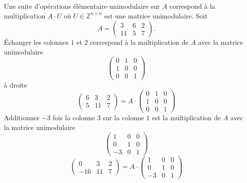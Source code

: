\begin{example}
  \label{exe:27}
  Une suite d'opérations élémentaire unimodulaire sur $A$ correspond à la multiplication $A⋅U$ où $U ∈ℤ^{n ×n}$ est une matrice unimodulaire.
Soit 
  \begin{displaymath}
    A =
    \begin{pmatrix}
      3 & 6 & 2 \\
      11 & 5 & 7
    \end{pmatrix}. 
  \end{displaymath}
  Échanger les colonnes $1$ et $2$ correspond à la multiplication de $A$ avec la matrice unimodulaire 
  \begin{displaymath}
    \begin{pmatrix}
    0& 1 & 0 \\
    1 & 0 & 0 \\
    0 & 0 & 1
      
    \end{pmatrix}
  \end{displaymath} à droite
  \begin{displaymath}
     \begin{pmatrix}
      6  & 3& 2 \\
       5 & 11 & 7
     \end{pmatrix} = A ⋅
     \begin{pmatrix}
       0& 1 & 0 \\
       1 & 0 & 0 \\
       0 & 0 & 1
     \end{pmatrix}
   \end{displaymath}
   Additionner $-3$ fois la colonne $3$ sur la colonne $1$ est la multiplication de $A$ avec la matrice unimodulaire 
   \begin{displaymath}
     \begin{pmatrix}       
     1 & 0 & 0\\ 
     0 & 1 & 0 \\
     -3 & 0 & 1
   \end{pmatrix}
 \end{displaymath} 
   \begin{displaymath}
     \begin{pmatrix}
      0  & 3& 2 \\
      -16 & 11 & 7
    \end{pmatrix} = A ⋅  \begin{pmatrix}
      
     1 & 0 & 0\\
     0 & 1 & 0 \\ 
     -3 & 0 & 1
   \end{pmatrix}
 \end{displaymath}
\end{example}


